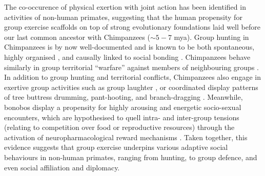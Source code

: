 \begin{CJK}{UTF8}{gbsn}
The co-occurence of physical exertion with joint action has been identified in activities of non-human primates, suggesting that the human propensity for group exercise scaffolds on top of strong evolutionary foundations laid well before our last common ancestor with Chimpanzees ($\sim5-7$ mya).  Group hunting in Chimpanzees is by now well-documented and is known to be both spontaneous, highly organised \citep[for example involving divisions of set roles; see][]{Boesch1989}, and causally linked to social bonding \citep{Mitani2001}.  Chimpanzees behave similarly in group territorial ``warfare'' against members of neighbouring groups \citep{Boehm1992,Wilson2014a}.
In addition to group hunting and territorial conflicts, Chimpanzees also engage in exertive group activities such as group laughter \citep{Waller2005}, or coordinated display patterns of tree buttress drumming, pant-hooting, and branch-dragging \citep[for example, observed as part of a ``rain dance,'' see][]{Goodall2000,Whiten2001}.  Meanwhile, bonobos display a propensity for highly arousing and energetic socio-sexual encounters, which are hypothesised to quell intra- and inter-group tensions (relating to competition over food or reproductive resources) through the activation of neuropharmacological reward mechanisms \citep{Dunbar1992,Parr2005,Clay2015}.  Taken together, this evidence suggests that group exercise underpins various adaptive social behaviours in non-human primates, ranging from hunting, to group defence, and even social affiliation and diplomacy.


\end{CJK}

